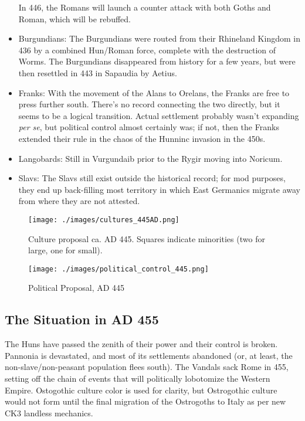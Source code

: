 \documentclass{article}
\begin{document}
\begin{itemize}
		In 446, the Romans will launch a counter attack with both Goths and Roman, which will be rebuffed.
		
		\item Burgundians:\newline
		The Burgundians were routed from their Rhineland Kingdom in 436 by a combined Hun/Roman force, complete with the destruction of Worms. 
		The Burgundians disappeared from history for a few years, but were then resettled in 443 in Sapaudia by Aetius.
		
		\item Franks:\newline
		With the movement of the Alans to Orelans, the Franks are free to press further south.
		There's no record connecting the two directly, but it seems to be a logical transition.
		Actual settlement probably wasn't expanding \textit{per se}, but political control almost certainly was; if not, then the Franks extended their rule in the chaos of the Hunninc invasion in the 450s.
		
		\item Langobards:\newline
		Still in Vurgundaib prior to the Rygir moving into Noricum.
		
		\item Slavs:\newline
		The Slavs still exist outside the historical record; for mod purposes, they end up back-filling most territory in which East Germanics migrate away from where they are not attested.
	\end{itemize}
	
	\newpage
	
	\begin{figure}[h!]
		\centering
		\texttt{[image: ./images/cultures\_445AD.png]}
		\caption{Culture proposal ca. AD 445. Squares indicate minorities (two for large, one for small).}
	\end{figure}
	
	\begin{figure}[h!]
		\centering
		\texttt{[image: ./images/political\_control\_445.png]}
		\caption{Political Proposal, AD 445}
	\end{figure}
	
	\newpage
	
	\subsection{The Situation in AD 455}
	\label{sec:timeline:subsec:455}
	The Huns have passed the zenith of their power and their control is broken.
	Pannonia is devastated, and most of its settlements abandoned (or, at least, the non-slave/non-peasant population flees south).
	The Vandals sack Rome in 455, setting off the chain of events that will politically lobotomize the Western Empire.
	Ostogothic culture color is used for clarity, but Ostrogothic culture would not form until the final migration of the Ostrogoths to Italy as per new CK3 landless mechanics.
	
\end{document}
